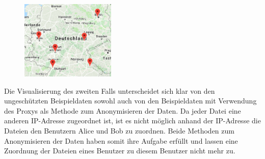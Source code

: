 \documentclass[
    fontsize=12pt,
    headings=small,
    parskip=half,           %
    bibliography=totoc,
    numbers=noenddot,       %
    open=any,               %
    ]{scrreprt}
\begin{document}
\begin{figure}[H]
\includegraphics[width=0.4\textwidth]{../pic/IP-Tor-SetB.PNG}
\label{fig:TIpM}
\end{figure}

Die Visualisierung des zweiten Falls unterscheidet sich klar von den ungeschützten Beispieldaten sowohl auch von den Beispieldaten mit Verwendung des Proxys als Methode zum Anonymisieren der Daten. 
Da jeder Datei eine anderen IP-Adresse zugeordnet ist, ist es nicht möglich anhand der IP-Adresse die Dateien den Benutzern Alice und Bob zu zuordnen.
Beide Methoden zum Anonymisieren der Daten haben somit ihre Aufgabe erfüllt und lassen eine Zuordnung der Dateien eines Benutzer zu diesem Benutzer nicht mehr zu.
\end{document}
